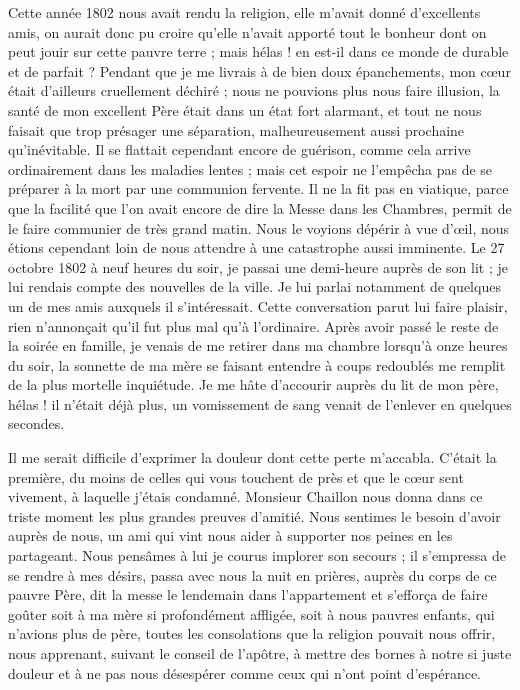 \documentclass[11pt,a4paper]{report}
\begin{document}
Cette année 1802 nous avait rendu la religion, elle m'avait donné d'excellents amis, on aurait donc pu croire qu'elle n'avait apporté tout le bonheur dont on peut jouir sur cette pauvre terre ; mais hélas ! en est-il dans ce monde de durable et de parfait ? Pendant que je me livrais à de bien doux épanchements, mon cœur était d'ailleurs cruellement déchiré ; nous ne pouvions plus nous faire illusion, la santé de mon excellent Père était dans un état fort alarmant, et tout ne nous faisait que trop présager une séparation, malheureusement aussi prochaine qu'inévitable. Il se flattait cependant encore de guérison, comme cela arrive ordinairement dans les maladies lentes ; mais cet espoir ne l'empêcha pas de se préparer à la mort par une communion fervente. Il ne la fit pas en viatique, parce que la facilité que l'on avait encore de dire la Messe dans les Chambres, permit de le faire communier de très grand matin. Nous le voyions dépérir à vue d'œil, nous étions cependant loin de nous attendre à une catastrophe aussi imminente. Le 27 octobre 1802 à neuf heures du soir, je passai une demi-heure auprès de son lit ; je lui rendais compte des nouvelles de la ville. Je lui parlai notamment de quelques un de mes amis auxquels il s'intéressait. Cette conversation parut lui faire plaisir, rien n'annonçait qu'il fut plus mal qu'à l'ordinaire. Après avoir passé le reste de la soirée en famille, je venais de me retirer dans ma chambre lorsqu'à onze heures du soir, la sonnette de ma mère se faisant entendre à coups redoublés me remplit de la plus mortelle inquiétude. Je me hâte d'accourir auprès du lit de mon père, hélas ! il n'était déjà plus, un vomissement de sang venait de l'enlever en quelques secondes.

Il me serait difficile d'exprimer la douleur dont cette perte m'accabla. C'était la première, du moins de celles qui vous touchent de près et que le cœur sent vivement, à laquelle j'étais condamné. Monsieur Chaillon nous donna dans ce triste moment les plus grandes preuves d'amitié. Nous sentimes le besoin d'avoir auprès de nous, un ami qui vint nous aider à supporter nos peines en les partageant. Nous pensâmes à lui je courus implorer son secours ; il s'empressa de se rendre à mes désirs, passa avec nous la nuit en prières, auprès du corps de ce pauvre Père, dit la messe le lendemain dans l'appartement et s'efforça de faire goûter soit à ma mère si profondément affligée, soit à nous pauvres enfants, qui n'avions plus de père, toutes les consolations que la religion pouvait nous offrir, nous apprenant, suivant le conseil de l'apôtre, à mettre des bornes à notre si juste douleur et à ne pas nous désespérer comme ceux qui n'ont point d'espérance.
\end{document}
